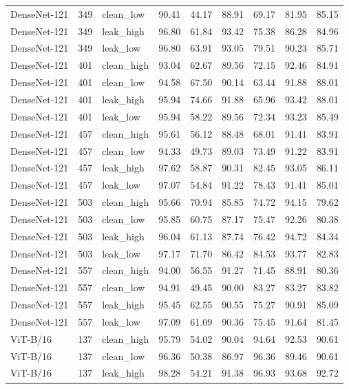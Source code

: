 {\begin{longtable}{lrlrrrrrr}
DenseNet-121 & 349 & clean\_low & 90.41 & 44.17 & 88.91 & 69.17 & 81.95 & 85.15 \\
DenseNet-121 & 349 & leak\_high & 96.80 & 61.84 & 93.42 & 75.38 & 86.28 & 84.96 \\
DenseNet-121 & 349 & leak\_low & 96.80 & 63.91 & 93.05 & 79.51 & 90.23 & 85.71 \\
DenseNet-121 & 401 & clean\_high & 93.04 & 62.67 & 89.56 & 72.15 & 92.46 & 84.91 \\
DenseNet-121 & 401 & clean\_low & 94.58 & 67.50 & 90.14 & 63.44 & 91.88 & 88.01 \\
DenseNet-121 & 401 & leak\_high & 95.94 & 74.66 & 91.88 & 65.96 & 93.42 & 88.01 \\
DenseNet-121 & 401 & leak\_low & 95.94 & 58.22 & 89.56 & 72.34 & 93.23 & 85.49 \\
DenseNet-121 & 457 & clean\_high & 95.61 & 56.12 & 88.48 & 68.01 & 91.41 & 83.91 \\
DenseNet-121 & 457 & clean\_low & 94.33 & 49.73 & 89.03 & 73.49 & 91.22 & 83.91 \\
DenseNet-121 & 457 & leak\_high & 97.62 & 58.87 & 90.31 & 82.45 & 93.05 & 86.11 \\
DenseNet-121 & 457 & leak\_low & 97.07 & 54.84 & 91.22 & 78.43 & 91.41 & 85.01 \\
DenseNet-121 & 503 & clean\_high & 95.66 & 70.94 & 85.85 & 74.72 & 94.15 & 79.62 \\
DenseNet-121 & 503 & clean\_low & 95.85 & 60.75 & 87.17 & 75.47 & 92.26 & 80.38 \\
DenseNet-121 & 503 & leak\_high & 96.04 & 61.13 & 87.74 & 76.42 & 94.72 & 84.34 \\
DenseNet-121 & 503 & leak\_low & 97.17 & 71.70 & 86.42 & 84.53 & 93.77 & 82.83 \\
DenseNet-121 & 557 & clean\_high & 94.00 & 56.55 & 91.27 & 71.45 & 88.91 & 80.36 \\
DenseNet-121 & 557 & clean\_low & 94.91 & 49.45 & 90.00 & 83.27 & 83.27 & 83.82 \\
DenseNet-121 & 557 & leak\_high & 95.45 & 62.55 & 90.55 & 75.27 & 90.91 & 85.09 \\
DenseNet-121 & 557 & leak\_low & 97.09 & 61.09 & 90.36 & 75.45 & 91.64 & 81.45 \\
ViT-B/16 & 137 & clean\_high & 95.79 & 54.02 & 90.04 & 94.64 & 92.53 & 90.61 \\
ViT-B/16 & 137 & clean\_low & 96.36 & 50.38 & 86.97 & 96.36 & 89.46 & 90.61 \\
ViT-B/16 & 137 & leak\_high & 98.28 & 54.21 & 91.38 & 96.93 & 93.68 & 92.72 \\

\end{longtable}}

